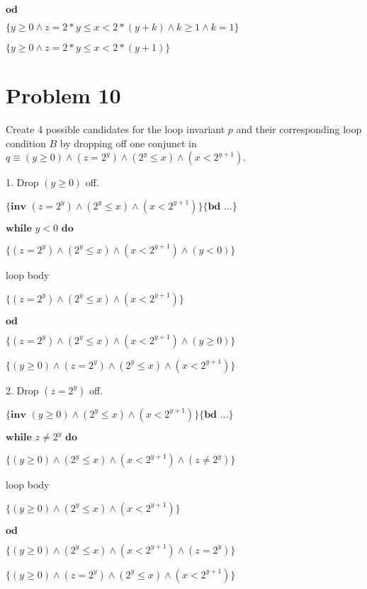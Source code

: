 \documentclass{article}
\begin{document}
$\textbf{od}$

$\{y \geq 0 \wedge z=2*y \leq x < 2*(y+k) \wedge k \geq 1 \wedge k=1\}$

$\{y \geq 0 \wedge z=2*y \leq x < 2*(y+1)\}$

\vspace{10pt}


\section*{Problem 10}

Create 4 possible candidates for the loop invariant $p$ and their corresponding loop condition $B$ by dropping off one conjunct in $q \equiv (y \geq 0) \wedge (z=2^y) \wedge (2^y \leq x) \wedge (x<2^{y+1})$.

1. Drop $(y \geq 0)$ off.
\vspace{10pt}

$\{\textbf{inv } (z=2^y) \wedge (2^y \leq x) \wedge (x<2^{y+1})\} \{\textbf{bd } ...\}$

$\textbf{while } y < 0 \textbf{ do}$

\qquad \qquad $\{(z=2^y) \wedge (2^y \leq x) \wedge (x<2^{y+1}) \wedge  (y < 0)\}$

\qquad \qquad loop body

\qquad \qquad $\{(z=2^y) \wedge (2^y \leq x) \wedge (x<2^{y+1}) \}$

$\textbf{od}$

$\{(z=2^y) \wedge (2^y \leq x) \wedge (x<2^{y+1}) \wedge (y \geq 0)\}$

$\{(y \geq 0) \wedge (z=2^y) \wedge (2^y \leq x) \wedge (x<2^{y+1})\}$

\vspace{10pt}
2. Drop $(z=2^y)$ off.
\vspace{10pt}

$\{\textbf{inv } (y \geq 0) \wedge (2^y \leq x) \wedge (x<2^{y+1})\} \{\textbf{bd } ...\}$

$\textbf{while } z \neq 2^y \textbf{ do}$

\qquad \qquad $\{(y \geq 0) \wedge (2^y \leq x) \wedge (x<2^{y+1}) \wedge (z \neq 2^y)\}$

\qquad \qquad loop body

\qquad \qquad $\{(y \geq 0) \wedge (2^y \leq x) \wedge (x<2^{y+1})\}$

$\textbf{od}$

$\{(y \geq 0) \wedge (2^y \leq x) \wedge (x<2^{y+1}) \wedge (z=2^y)\}$

$\{(y \geq 0) \wedge (z=2^y) \wedge (2^y \leq x) \wedge (x<2^{y+1})\}$
\end{document}
